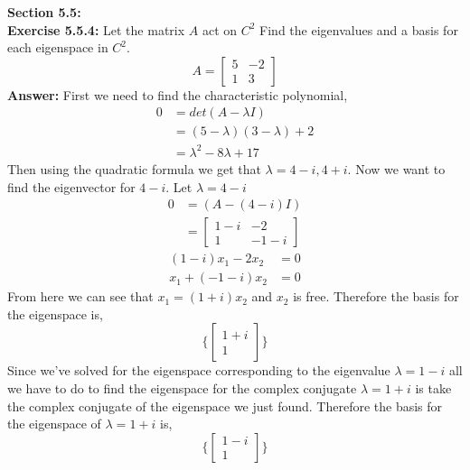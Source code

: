 \documentclass{amsart}
\begin{document}
\thispagestyle{fancy}





{\huge\textbf{Section 5.5:}}\\
\noindent\textbf{Exercise 5.5.4: } Let the matrix $A$ act on $C^2$ Find the eigenvalues and a basis for each eigenspace in $C^2$.
 \begin{equation*}
A = 
\begin{bmatrix}
5 &-2\\
1 &3
\end{bmatrix}
\end{equation*}
\noindent \textbf{Answer: }First we need to find the characteristic polynomial,
\begin{align*}
 0 &= det(A - \lambda I)\\
 &= (5-\lambda)(3 - \lambda)+2\\
 &= \lambda^2-8\lambda+17
\end{align*}
Then using the quadratic formula we get that $\lambda = 4 - i, 4 + i$. Now we want to find the eigenvector for $4 - i$. Let $\lambda = 4 - i$
\begin{align*}
0&=(A - (4 - i)I)\\
&=
\begin{bmatrix}
1 - i & -2 \\
1 & -1-i
\end{bmatrix}
\end{align*}
\begin{align*}
(1-i)x_1 - 2x_2 &= 0\\
x_1 + (-1-i)x_2 &= 0
\end{align*}
From here we can see that $x_1 = (1+i)x_2$ and $x_2$ is free. Therefore the basis for the eigenspace is,
\begin{equation*}
\{
\begin{bmatrix}
1+i\\
1
\end{bmatrix}
\}
\end{equation*}
Since we've solved for the eigenspace corresponding to the eigenvalue $\lambda = 1- i$ all we have to do to find the eigenspace for the complex conjugate $\lambda = 1+i$ is take the complex conjugate of the eigenspace we just found. Therefore the basis for the eigenspace of $\lambda = 1+i$ is,
\begin{equation*}
\{
\begin{bmatrix}
1-i\\
1
\end{bmatrix}
\}
\end{equation*}
\end{document}
